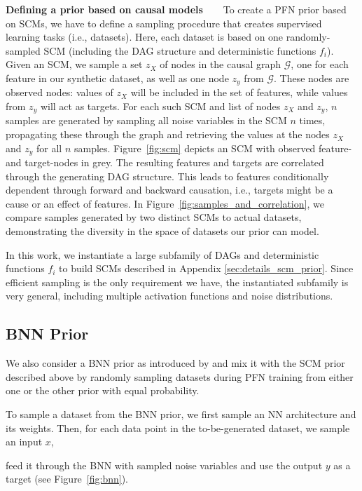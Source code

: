 \textbf{Defining a prior based on causal models~~~} To create a PFN prior based on SCMs, we have to define a sampling procedure that creates supervised learning tasks (i.e., datasets). Here, each dataset is based on one randomly-sampled SCM (including the DAG structure and deterministic functions $f_i$). Given an SCM, we sample a set $z_X$ of nodes in the causal graph $\mathcal{G}$, one for each feature in our synthetic dataset, as well as one node $z_y$ from $\mathcal{G}$.
These nodes are observed nodes: values of $z_X$ will be included in the set of features, while values from $z_y$ will act as targets. For each such SCM and list of nodes $z_X$ and $z_y$, $n$ samples are generated by sampling all noise variables in the SCM $n$ times, propagating these through the graph and retrieving the values at the nodes $z_X$ and $z_y$ for all $n$ samples.
Figure~\ref{fig:scm} depicts an SCM with observed feature- and target-nodes in grey. The resulting features and targets are correlated through the generating DAG structure. This leads to features conditionally dependent through forward and backward causation, i.e., targets might be a cause or an effect of features. In Figure~\ref{fig:samples_and_correlation}, we compare samples generated by two distinct SCMs to actual datasets, demonstrating the diversity in the space of datasets our prior can model. 

In this work, we instantiate a large subfamily of DAGs and deterministic functions $f_i$ to build SCMs described in Appendix \ref{sec:details_scm_prior}.
Since efficient sampling is the only requirement we have, the instantiated subfamily is very general, including multiple activation functions and noise distributions.

\subsection{BNN Prior}
\label{sec:bnn prior}

We also consider a BNN prior as introduced by \citet{muller-iclr22a} and mix it with the SCM prior described above by randomly sampling datasets during PFN training from either one or the other prior with equal probability.

To sample a dataset from the BNN prior, we first sample an NN architecture and its weights. Then, for each data point in the to-be-generated dataset, we sample an input $x$,

feed it through the BNN with sampled noise variables and use the output $y$ as a target (see Figure~\ref{fig:bnn}).

